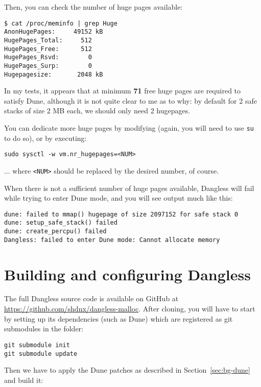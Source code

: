 Then, you can check the number of huge pages available:

\begin{verbatim}
$ cat /proc/meminfo | grep Huge
AnonHugePages:     49152 kB
HugePages_Total:     512
HugePages_Free:      512
HugePages_Rsvd:        0
HugePages_Surp:        0
Hugepagesize:       2048 kB
\end{verbatim}

In my tests, it appears that at minimum \textbf{71} free huge pages are required to satisfy Dune, although it is not quite clear to me as to why: by default for 2 safe stacks of size 2 MB each, we should only need 2 hugepages.

You can dedicate more huge pages by modifying  (again, you will need to use \texttt{su} to do so), or by executing:

\begin{verbatim}
sudo sysctl -w vm.nr_hugepages=<NUM>
\end{verbatim}

... where \texttt{<NUM>} should be replaced by the desired number, of course.

When there is not a sufficient number of huge pages available, Dangless will fail while trying to enter Dune mode, and you will see output much like this:

\begin{verbatim}
dune: failed to mmap() hugepage of size 2097152 for safe stack 0
dune: setup_safe_stack() failed
dune: create_percpu() failed
Dangless: failed to enter Dune mode: Cannot allocate memory
\end{verbatim}

\section{Building and configuring Dangless}

The full Dangless source code is available on GitHub at \url{https://github.com/shdnx/dangless-malloc}. After cloning, you will have to start by setting up its dependencies (such as Dune) which are registered as git submodules in the  folder:

\begin{verbatim}
git submodule init
git submodule update
\end{verbatim}

Then we have to apply the Dune patches as described in Section~\ref{sec:bg-dune} and build it:

